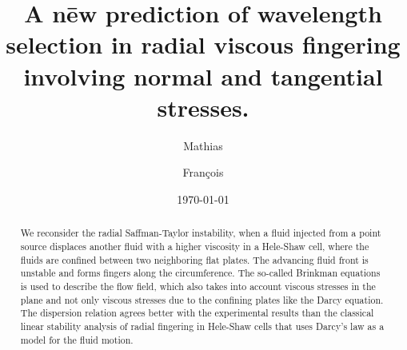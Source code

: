 \documentclass[aip,preprint,jmp,showpacs,showkeys]{revtex4-1}
\begin{document}

\preprint{}

\title{A nēw prediction of wavelength selection in radial viscous fingering involving normal and tangential stresses.}

\author{Mathias }
\author{Fran\c{c}ois }%
%




\newcommand{\order}[1]{$\mathcal{O}(#1)$}

\date{\today}

\begin{abstract}

We reconsider the radial Saffman-Taylor instability, when a fluid injected from a point source displaces another fluid with a higher viscosity in a Hele-Shaw cell, where the fluids are confined between two neighboring flat plates. The advancing fluid front is unstable and forms fingers along the circumference.
The so-called Brinkman equations is used to describe the flow field, which also takes into account viscous stresses in the plane and not only viscous stresses due to the confining plates like the Darcy equation. The dispersion relation agrees better with the experimental results than the classical linear stability analysis of radial fingering in Hele-Shaw cells that uses Darcy's law as a model for the fluid motion. 

\end{abstract}
\end{document}
